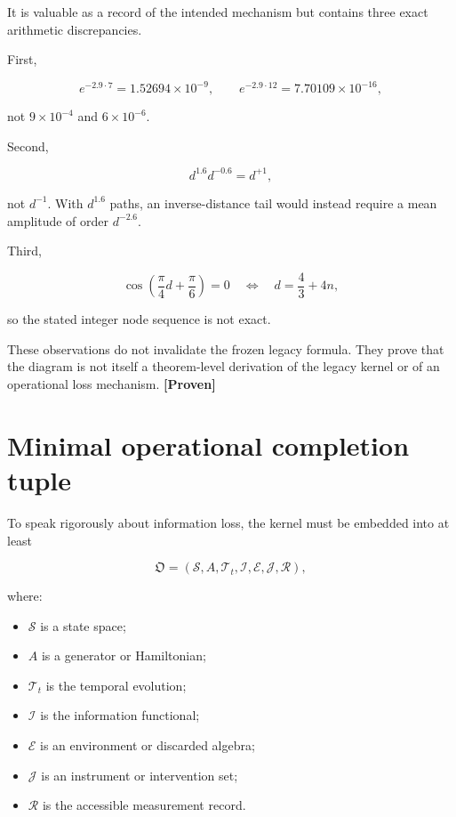 \documentclass[11pt,a4paper,openany]{report}
\newcommand{\statusProven}{\textcolor{fingreen}{[Proven]}}
\begin{document}
It is valuable as a record of the intended mechanism but contains three exact arithmetic discrepancies.

First,

\[
e^{-2.9\cdot7}=1.52694\times10^{-9},
\qquad
e^{-2.9\cdot12}=7.70109\times10^{-16},
\]

not \(9\times10^{-4}\) and \(6\times10^{-6}\).

Second,

\[
d^{1.6}d^{-0.6}=d^{+1},
\]

not \(d^{-1}\). With \(d^{1.6}\) paths, an inverse-distance tail would instead require a mean amplitude of order \(d^{-2.6}\).

Third,

\[
\cos\left(\frac\pi4d+\frac\pi6\right)=0
\quad\Longleftrightarrow\quad
d=\frac43+4n,
\]

so the stated integer node sequence is not exact.

These observations do not invalidate the frozen legacy formula. They prove that the diagram is not itself a theorem-level derivation of the legacy kernel or of an operational loss mechanism. \textbf{\statusProven{}}

\section{Minimal operational completion tuple}

To speak rigorously about information loss, the kernel must be embedded into at least

\[
\mathfrak O
=(\mathcal S,A,\mathcal T_t,\mathcal I,
\mathcal E,\mathcal J,\mathcal R),
\]

where:

\begin{itemize}
\item 
\(\mathcal{S}\) is a state space;

\item 
\(A\) is a generator or Hamiltonian;

\item 
\(\mathcal{T}_t\) is the temporal evolution;

\item 
\(\mathcal{I}\) is the information functional;

\item 
\(\mathcal{E}\) is an environment or discarded algebra;

\item 
\(\mathcal{J}\) is an instrument or intervention set;

\item 
\(\mathcal{R}\) is the accessible measurement record.

\end{itemize}
\end{document}
